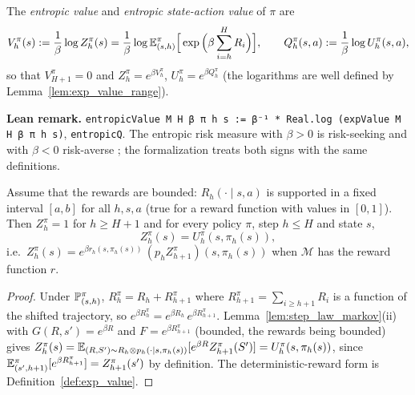 \begin{definition}\label{def:entropic_value}
\leanok
{}
The \emph{entropic value} and \emph{entropic state-action value} of $\pi$ are
\[
  V^\pi_h(s) := \frac1\beta \log Z^\pi_h(s)
  = \frac1\beta \log \mathbb{E}^\pi_{(s, h)}\Big[\exp\Big(\beta \sum_{i = h}^H R_i\Big)\Big],
  \qquad
  Q^\pi_h(s, a) := \frac1\beta \log U^\pi_h(s, a) ,
\]
so that $V^\pi_{H+1} = 0$ and $Z^\pi_h = e^{\beta V^\pi_h}$, $U^\pi_h = e^{\beta Q^\pi_h}$ (the
logarithms are well defined by Lemma~\ref{lem:exp_value_range}).
\end{definition}

\textbf{Lean remark.} \texttt{entropicValue M H β π h s := β⁻¹ * Real.log (expValue M H β π h s)},
\texttt{entropicQ}. The entropic risk measure with $\beta > 0$ is risk-seeking and with
$\beta < 0$ risk-averse \cite{borkar2001risk}; the formalization treats both signs with the
same definitions.

\begin{lemma}\label{lem:exp_bellman}
\leanok
{}
Assume that the rewards are bounded: $R_h(\cdot \mid s, a)$ is supported in a fixed interval
$[a, b]$ for all $h, s, a$ (true for a reward function with values in $[0, 1]$). Then
$Z^\pi_{h} = 1$ for $h \ge H + 1$ and for every policy $\pi$, step $h \le H$ and state $s$,
\[
  Z^\pi_h(s) = U^\pi_h(s, \pi_h(s)),
\]
i.e.\ $Z^\pi_h(s) = e^{\beta r_h(s, \pi_h(s))}\,(p_h Z^\pi_{h+1})(s, \pi_h(s))$ when $\mathcal M$
has the reward function $r$.
\end{lemma}

\begin{proof}
\leanok
Under $\mathbb{P}^\pi_{(s, h)}$, $R^\pi_h = R_h + R^\pi_{h+1}$ where $R^\pi_{h+1} = \sum_{i \ge h+1} R_i$
is a function of the shifted trajectory, so
$e^{\beta R^\pi_h} = e^{\beta R_h}\, e^{\beta R^\pi_{h+1}}$. Lemma~\ref{lem:step_law_markov}(ii) with
$G(R, s') = e^{\beta R}$ and $F = e^{\beta R^\pi_{h+1}}$ (bounded, the rewards being bounded)
gives
$Z^\pi_h(s) = \mathbb{E}_{(R, S') \sim R_h \otimes p_h(\cdot \mid s, \pi_h(s))}[e^{\beta R} Z^\pi_{h+1}(S')]
= U^\pi_h(s, \pi_h(s))$, since $\mathbb{E}^\pi_{(s', h+1)}[e^{\beta R^\pi_{h+1}}] = Z^\pi_{h+1}(s')$ by
definition. The deterministic-reward form is Definition~\ref{def:exp_value}.
\end{proof}

